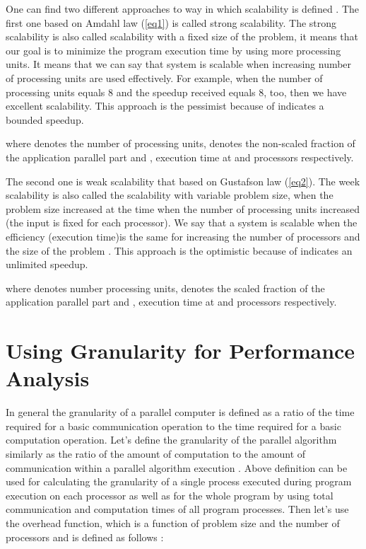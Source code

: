 \documentclass[runningheads]{llncs}
\begin{document}
One can find two different approaches to way in which scalability is defined \cite{shoukourian}. The first one based on Amdahl law (\ref{eq1}) is called strong scalability. The strong scalability is also called scalability with a fixed size of the problem, it means that our goal is to minimize the program execution time by using more processing units. It means that we can say that system is scalable when increasing number of processing units are used effectively. For example, when the number of processing units equals 8 and the speedup received equals 8, too, then we have excellent scalability. This approach is the pessimist because of indicates a bounded speedup. 



\noindent where  denotes the number of processing units,  denotes the non-scaled fraction of the application parallel part and ,  execution time at  and  processors respectively. 

The second one is weak scalability that based on Gustafson law  (\ref{eq2}). The week scalability is also called the scalability with variable problem size, when the problem size increased at the time when the number of processing units increased (the input is fixed for each processor). We say that a system is scalable when the efficiency (execution time)is the same for increasing the number of processors and the size of the problem \cite{grama}. This approach is the optimistic because of indicates an unlimited speedup.



\noindent where  denotes number processing units,  denotes the scaled fraction of the application parallel part and ,  execution time at  and  processors respectively. 

\section{Using Granularity for Performance Analysis}

In general the granularity of a parallel computer is defined as a ratio of the time required for a basic communication operation to the time required for a basic computation operation. Let's define the granularity of the parallel algorithm similarly as the ratio of the amount of computation to the amount of communication within a parallel algorithm execution . Above definition can be used for calculating the granularity of a single process executed during program execution on each processor as well as
for the whole program by using total communication and computation times of all program processes. 
Then let's use the overhead function, which is a function of problem size and the number
of processors and is defined as follows \cite{grama}:
\end{document}
